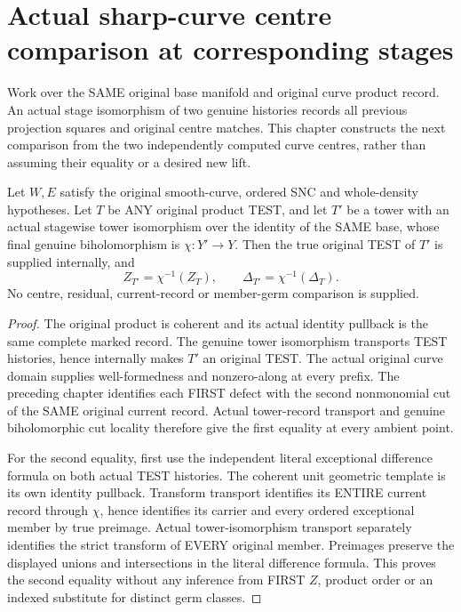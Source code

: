 \section{Actual sharp-curve centre comparison at corresponding stages}

Work over the SAME original base manifold and original curve product
record. An actual stage isomorphism of two genuine histories records all
previous projection squares and original centre matches. This chapter
constructs the next comparison from the two independently computed curve
centres, rather than assuming their equality or a desired new lift.

\begin{theorem}
\label{hir:sharp-original-curve-defects-stage-isomorphism}
\leanok
Let $W,E$ satisfy the original smooth-curve, ordered SNC and whole-density
hypotheses. Let $T$ be ANY original product TEST, and let $T'$ be a tower
with an actual stagewise tower isomorphism over the identity of the SAME
base, whose final genuine biholomorphism is $\chi:Y'\to Y$. Then the true
original TEST of $T'$ is supplied internally, and
\[
 Z_{T'}=\chi^{-1}(Z_T),\qquad
 \Delta_{T'}=\chi^{-1}(\Delta_T).
\]
No centre, residual, current-record or member-germ comparison is supplied.
\end{theorem}
\begin{proof}
The original product is coherent and its actual identity pullback is the
same complete marked record. The genuine tower isomorphism transports
TEST histories, hence internally makes $T'$ an original TEST. The
actual original curve domain supplies well-formedness and nonzero-along
at every prefix. The preceding chapter identifies each FIRST defect
with the second nonmonomial cut of the SAME original current record.
Actual tower-record transport and genuine biholomorphic cut locality
therefore give the first equality at every ambient point.

For the second equality, first use the independent literal exceptional
difference formula on both actual TEST histories. The coherent unit
geometric template is its own identity pullback. Transform transport
identifies its ENTIRE current record through $\chi$, hence identifies its
carrier and every ordered exceptional member by true preimage. Actual
tower-isomorphism transport separately identifies the strict transform
of EVERY original member. Preimages preserve the displayed unions and
intersections in the literal difference formula. This proves the second
equality without any inference from FIRST $Z$, product order or an
indexed substitute for distinct germ classes.
\end{proof}

